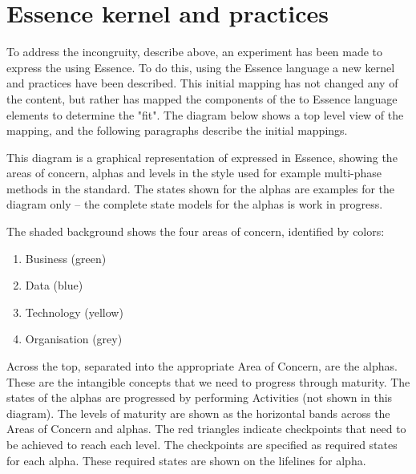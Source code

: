 \section{ Essence kernel and practices}\label{subsec:ekg-mm-essence-kernel-and-practices}

To address the incongruity, describe above, an experiment has been made to express the 
using Essence.
To do this, using the Essence language a new kernel and practices have been described.
This initial mapping has not changed any of the content, but rather has mapped the components of
the  to Essence language elements to determine the "fit".
The diagram below shows a top level view of the mapping, and the following paragraphs describe the initial mappings.


This diagram is a graphical representation of  expressed in Essence, showing the areas of concern,
alphas and levels in the style used for example multi-phase methods in the  standard.
The states shown for the alphas are examples for the diagram only -- the complete state models for the alphas
is work in progress.

The shaded background shows the four areas of concern, identified by colors:

\begin{enumerate}
    \item Business (green)
    \item Data (blue)
    \item Technology (yellow)
    \item Organisation (grey)
\end{enumerate}

Across the top, separated into the appropriate Area of Concern, are the alphas.
These are the intangible concepts that we need to progress through maturity.
The states of the alphas are progressed by performing Activities (not shown in this diagram).
The levels of maturity are shown as the horizontal bands across the Areas of Concern and alphas.
The red triangles indicate checkpoints that need to be achieved to reach each level.
The checkpoints are specified as required states for each alpha.
These required states are shown on the lifelines for alpha.


